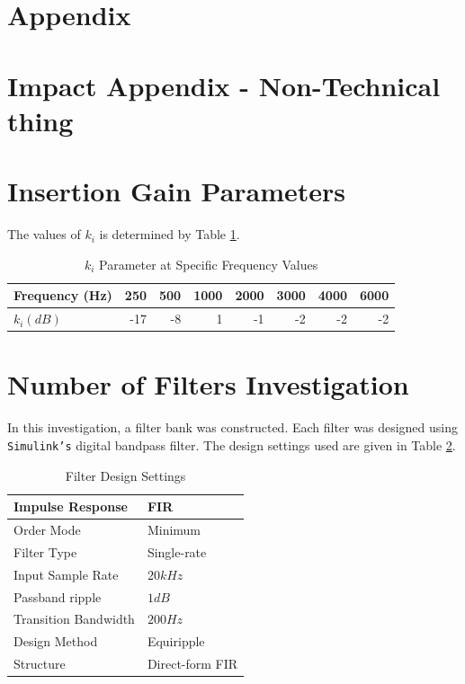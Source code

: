\documentclass[12pt, onecolumn]{article}
\begin{document}
\section*{Appendix}
\begin{appendices}

\section{Impact Appendix - Non-Technical thing}


\section{Insertion Gain Parameters}
\label{app:insertGainParam}

\noindent The values of $k_i$ is determined by Table \ref{tab:kiVal}.

\begin{table}[htbp]
  \centering
  \caption{$k_i$ Parameter at Specific Frequency Values}
    \begin{tabular}{|l|r|r|r|r|r|r|r|}
    \hline
    \textbf{Frequency (Hz)} & 250   & 500   & 1000  & 2000  & 3000  & 4000  & 6000 \\
    \hline
    \textbf{$k_i (dB)$} & -17   & -8    & 1     & -1    & -2    & -2    & -2 \\
    \hline
    \end{tabular}%
  \label{tab:kiVal}%
\end{table}%


\section{Number of Filters Investigation}
\label{app:numFilt}

\noindent In this investigation, a filter bank was constructed. Each filter was designed using \texttt{Simulink's} digital bandpass filter. The design settings used are given in Table \ref{tab:numFilt_FiltSpec}.

\begin{table}[htbp]
  \centering
  \caption{Filter Design Settings}
  
    \begin{tabular}{|l|l|}
    \hline
    Impulse Response  & FIR  \\
    \hline
    Order Mode & Minimum \\
    \hline
    Filter Type & Single-rate \\
    \hline
    Input Sample Rate & $20kHz$ \\
    \hline
    Passband ripple & $1dB$ \\
    \hline
    Transition Bandwidth & $200Hz$ \\
    \hline
    Design Method & Equiripple \\
    \hline
    Structure  & Direct-form FIR \\
    \hline
    \end{tabular}%
  \label{tab:numFilt_FiltSpec}%
\end{table}%


\end{appendices}
\end{document}
